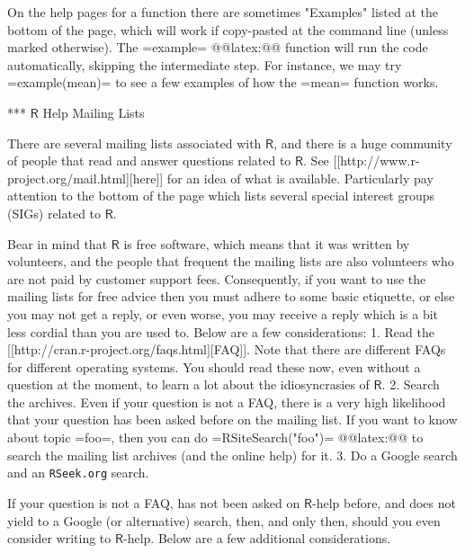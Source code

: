 On the help pages for a function there are sometimes "Examples"
listed at the bottom of the page, which will work if copy-pasted at
the command line (unless marked otherwise). The =example=
@@latex:@@ function will run the code
automatically, skipping the intermediate step. For instance, we may
try =example(mean)= to see a few examples of how the =mean= function
works.

*** \(\mathsf{R}\) Help Mailing Lists

There are several mailing lists associated with \(\mathsf{R}\), and
there is a huge community of people that read and answer questions
related to \(\mathsf{R}\). See [[http://www.r-project.org/mail.html][here]] for an idea of what is
available. Particularly pay attention to the bottom of the page which
lists several special interest groups (SIGs) related to
\(\mathsf{R}\).

Bear in mind that \(\mathsf{R}\) is free software, which means that it
was written by volunteers, and the people that frequent the mailing
lists are also volunteers who are not paid by customer support
fees. Consequently, if you want to use the mailing lists for free
advice then you must adhere to some basic etiquette, or else you may
not get a reply, or even worse, you may receive a reply which is a bit
less cordial than you are used to. Below are a few considerations:
1. Read the [[http://cran.r-project.org/faqs.html][FAQ]]. Note that there are different FAQs for different
   operating systems. You should read these now, even without a
   question at the moment, to learn a lot about the idiosyncrasies of
   \(\mathsf{R}\).
2. Search the archives. Even if your question is not a FAQ, there is a
   very high likelihood that your question has been asked before on
   the mailing list. If you want to know about topic =foo=, then you
   can do =RSiteSearch("foo")=
   @@latex:@@ to search the
   mailing list archives (and the online help) for it.
3. Do a Google search and an \texttt{RSeek.org} search.

If your question is not a FAQ, has not been asked on
\(\mathsf{R}\)-help before, and does not yield to a Google (or
alternative) search, then, and only then, should you even consider
writing to \(\mathsf{R}\)-help. Below are a few additional
considerations.

